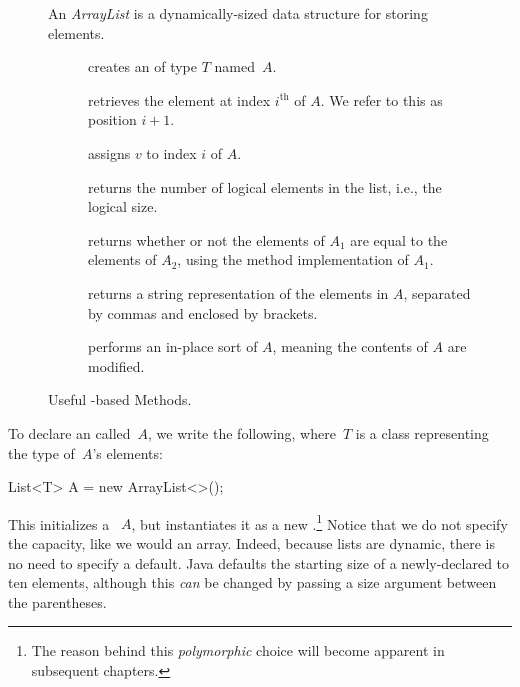 \begin{figure}[tp]
  \small
  \begin{tcolorbox}[title=Java Array Lists]
    An \emph{ArrayList} is a dynamically-sized data structure for storing elements.
    \vspace{2ex}
  \begin{description}
    \item [] creates an  of type $T$ named~$A$.
    \item [] retrieves the element at index $i^{\text{th}}$ of $A$. We refer to this as position $i + 1$. 
    \item [] assigns $v$ to index $i$ of $A$.
    \item [] returns the number of logical elements in the list, i.e., the logical size.
    \item [] returns whether or not the elements of $A_1$ are equal to the elements of $A_2$, using the  method implementation of $A_1$.
    \item [] returns a string representation of the elements in $A$, separated by commas and enclosed by brackets.
    \item [] performs an in-place sort of $A$, meaning the contents of $A$ are modified.
  \end{description}
\end{tcolorbox}
  \caption{Useful -based Methods.}
  \label{fig:arraylists}
\end{figure}

To declare an  called~$A$, we write the following, where~$T$ is a class representing the type of~$A$'s elements:

\begin{verbnobox}[\small]
List<T> A = new ArrayList<>();
\end{verbnobox}

This initializes a ~$A$, but instantiates it as a new .\footnote{The reason behind this \emph{polymorphic} choice will become apparent in subsequent chapters.} 
Notice that we do not specify the capacity, like we would an array. 
Indeed, because lists are dynamic, there is no need to specify a default. 
Java defaults the starting size of a newly-declared  to ten elements, although this \emph{can} be changed by passing a size argument between the parentheses.

